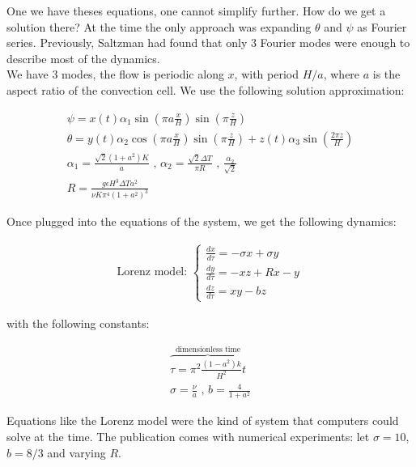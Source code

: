 One we have theses equations, one cannot simplify further. How do we get a solution there? At the time the only approach was expanding $\theta$ and $\psi$ as Fourier series. Previously, Saltzman had found that only $3$ Fourier modes were enough to describe most of the dynamics. \\

We have $3$ modes, the flow is periodic along $x$, with period $H/a$, where $a$ is the aspect ratio of the convection cell. We use the following solution approximation:

\begin{align*}
    \psi = x(t) \alpha_1 \sin\left( \pi a \frac{x}{H} \right) \sin\left( \pi \frac{z}{H} \right) \\
    \theta = y(t) \alpha_2 \cos\left( \pi a \frac{x}{H} \right) \sin\left( \pi \frac{z}{H} \right) + z(t) \alpha_3 \sin\left(\frac{2 \pi z}{H}\right) \\
    \alpha_1 = \frac{\sqrt{2} (1+a^2) K }{a}\text{ , }\alpha_2 = \frac{\sqrt{2} \Delta T }{\pi R} \text{ , } \frac{\alpha_2}{\sqrt{2}} \\
    R = \frac{g \epsilon H^3 \Delta T a^2}{\nu K \pi^4 (1+a^2)^3}
\end{align*}

Once plugged into the equations of the system, we get the following dynamics:

\begin{align*}
    \text{Lorenz model: }
    \begin{cases}
        \frac{d x}{d \tau} = - \sigma x + \sigma y \\
        \frac{d y}{d \tau} = - xz + Rx - y \\
        \frac{d z}{d \tau} = xy - bz 
    \end{cases}
\end{align*}

with the following constants:

\begin{align*}
    \overbrace{\tau = \pi^2 \frac{(1-a^2)k}{H^2} t}^\text{dimensionless time} \\
    \sigma = \frac{\nu}{a} \text{ , } b = \frac{4}{1 + a^2}
\end{align*}

Equations like the Lorenz model were the kind of system that computers could solve at the time. The publication comes with numerical experiments: let $\sigma=10$, $b=8/3$ and varying $R$.

